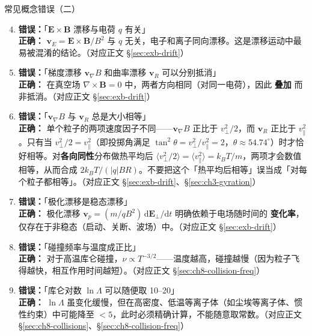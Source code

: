 \documentclass[12pt,a4paper,openany,oneside]{book}
\newcommand{\vect}[1]{\bm{#1}}
\newcommand{\curl}{\nabla\times}
\begin{document}
\begin{warning}{常见概念错误（二）}{}
\begin{enumerate}
\setcounter{enumi}{3}
\item \textbf{错误：}「$\vect{E}\times\vect{B}$ 漂移与电荷 $q$ 有关」\\
\textbf{正确：} $\vect{v}_E = \vect{E}\times\vect{B}/B^2$ 与 $q$ 无关，电子和离子同向漂移。这是漂移运动中最易被混淆的结论。（对应正文 \S\ref{sec:exb-drift}）

\item \textbf{错误：}「梯度漂移 $\vect{v}_\nabla B$ 和曲率漂移 $\vect{v}_R$ 可以分别抵消」\\
\textbf{正确：} 在真空场 $\curl\vect{B}=0$ 中，两者方向相同（对同一电荷），因此 \textbf{叠加} 而非抵消。（对应正文 \S\ref{sec:exb-drift}）

\item \textbf{错误：}「$\vect{v}_\nabla B$ 与 $\vect{v}_R$ 总是大小相等」\\
\textbf{正确：} 单个粒子的两项速度因子不同——$\vect{v}_\nabla B$ 正比于 $v_\perp^2/2$，而 $\vect{v}_R$ 正比于 $v_\parallel^2$。只有当 $v_\perp^2/2=v_\parallel^2$（即投掷角满足 $\tan^2\theta=v_\perp^2/v_\parallel^2=2$，$\theta\approx54.74^\circ$）时才恰好相等。对\textbf{各向同性}分布做热平均后 $\langle v_\perp^2/2\rangle=\langle v_\parallel^2\rangle=k_BT/m$，两项才会数值相等，从而合成 $2k_BT/(|q|BR)$。不要把这个「热平均后相等」误当成「对每个粒子都相等」。（对应正文 \S\ref{sec:exb-drift}、\S\ref{sec:ch3-gyration}）

\item \textbf{错误：}「极化漂移是稳态漂移」\\
\textbf{正确：} 极化漂移 $\vect{v}_p = (m/qB^2)\,\mathrm{d}\vect{E}_\perp/\mathrm{d}t$ 明确依赖于电场随时间的 \textbf{变化率}，仅存在于非稳态（启动、关断、波场）中。（对应正文 \S\ref{sec:exb-drift}）

\item \textbf{错误：}「碰撞频率与温度成正比」\\
\textbf{正确：} 对于高温库仑碰撞，$\nu\propto T^{-3/2}$——温度越高，碰撞越慢（因为粒子飞得越快，相互作用时间越短）。（对应正文 \S\ref{sec:ch8-collision-freq}）

\item \textbf{错误：}「库仑对数 $\ln\Lambda$ 可以随便取 10--20」\\
\textbf{正确：} $\ln\Lambda$ 虽变化缓慢，但在高密度、低温等离子体（如尘埃等离子体、惯性约束）中可能降至 $<5$，此时必须精确计算，不能随意取常数。（对应正文 \S\ref{sec:ch8-collisions}、\S\ref{sec:ch8-collision-freq}）
\end{enumerate}
\end{warning}
\end{document}
